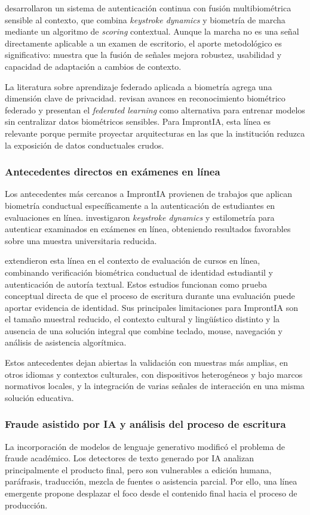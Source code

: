 \textcite{Ayeswarya2025} desarrollaron un sistema de autenticación continua con fusión multibiométrica sensible al contexto, que combina \textit{keystroke dynamics} y biometría de marcha mediante un algoritmo de \textit{scoring} contextual. Aunque la marcha no es una señal directamente aplicable a un examen de escritorio, el aporte metodológico es significativo: muestra que la fusión de señales mejora robustez, usabilidad y capacidad de adaptación a cambios de contexto.

La literatura sobre aprendizaje federado aplicada a biometría agrega una dimensión clave de privacidad. \textcite{Guo2024} revisan avances en reconocimiento biométrico federado y presentan el \textit{federated learning} como alternativa para entrenar modelos sin centralizar datos biométricos sensibles. Para ImprontIA, esta línea es relevante porque permite proyectar arquitecturas en las que la institución reduzca la exposición de datos conductuales crudos.

\subsubsection{Antecedentes directos en exámenes en línea}
Los antecedentes más cercanos a ImprontIA provienen de trabajos que aplican biometría conductual específicamente a la autenticación de estudiantes en evaluaciones en línea. \textcite{Stewart2011} investigaron \textit{keystroke dynamics} y estilometría para autenticar examinados en exámenes en línea, obteniendo resultados favorables sobre una muestra universitaria reducida.

\textcite{Monaco2013} extendieron esta línea en el contexto de evaluación de cursos en línea, combinando verificación biométrica conductual de identidad estudiantil y autenticación de autoría textual. Estos estudios funcionan como prueba conceptual directa de que el proceso de escritura durante una evaluación puede aportar evidencia de identidad. Sus principales limitaciones para ImprontIA son el tamaño muestral reducido, el contexto cultural y lingüístico distinto y la ausencia de una solución integral que combine teclado, mouse, navegación y análisis de asistencia algorítmica.

Estos antecedentes dejan abiertas la validación con muestras más amplias, en otros idiomas y contextos culturales, con dispositivos heterogéneos y bajo marcos normativos locales, y la integración de varias señales de interacción en una misma solución educativa.

\subsubsection{Fraude asistido por IA y análisis del proceso de escritura}
La incorporación de modelos de lenguaje generativo modificó el problema de fraude académico. Los detectores de texto generado por IA analizan principalmente el producto final, pero son vulnerables a edición humana, paráfrasis, traducción, mezcla de fuentes o asistencia parcial. Por ello, una línea emergente propone desplazar el foco desde el contenido final hacia el proceso de producción.

